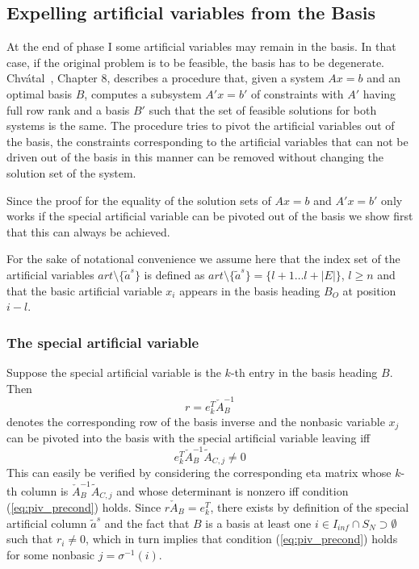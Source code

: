 \documentclass[a4paper]{article}
\begin{document}
\subsection{Expelling artificial variables from the Basis}
At the end of phase I some artificial variables may remain in the basis.
In that case, if the original problem is to be feasible, the basis has to be
degenerate.
Chv\'{a}tal~\cite{Chvatal}, Chapter 8, describes a procedure that,
given a system $Ax = b$ and an optimal
basis $B$, computes a subsystem $A'x = b'$ of constraints with $A'$ having full
row rank and a basis $B'$ such that the set of feasible solutions for both
systems is the same. The procedure tries to pivot the artificial variables out of
the basis, the constraints corresponding to the artificial variables that can
not be driven out of the basis in this manner can be removed without changing
the solution set of the system.

Since the proof for the equality of the solution sets of $Ax = b$ and
$A'x = b'$ only works if the special artificial variable can be pivoted out of
the basis we show first that this can always be achieved.

For the sake of notational convenience we assume here that the index set of the
artificial variables $art\setminus \{\tilde{a}^{s}\}$ is defined as
$art\setminus \{\tilde{a}^{s}\}=\{l+1 \ldots l+\left|E\right| \}$,
$l \geq n$ and that the basic artificial variable $x_{i}$ appears in the
basis heading $B_{O}$ at position $i-l$. 
\subsubsection{The special artificial variable}
Suppose the special artificial variable is the $k$-th entry in the basis
heading $B$. Then 
\[ 
  r = e_{k}^{T} \check{A}_{B}^{-1}
\]
denotes the corresponding row of the basis inverse and
the nonbasic variable $x_{j}$ can be pivoted into the basis
with the special artificial variable leaving iff 
\begin{equation} \label{eq:piv_precond}
e_{k}^{T}\check{A}_{B}^{-1}\tilde{A}_{C,j} \neq 0
\end{equation}
This can easily be verified by considering the corresponding eta matrix
whose $k$-th column is $\check{A}_{B}^{-1}\tilde{A}_{C,j}$ and whose determinant
is nonzero iff condition (\ref{eq:piv_precond}) holds.
Since $r \check{A}_{B} = e_{k}^{T}$, there exists by definition of 
the special artificial column $\tilde{a}^{s}$ and the fact that $B$ is a basis
at least one
$i \in I_{inf} \cap S_{N} \supset \emptyset$ such that
$r_{i} \neq 0$, which in turn implies that condition
(\ref{eq:piv_precond}) holds for some nonbasic
$j = \sigma^{-1} \left( i \right)$.
\end{document}
